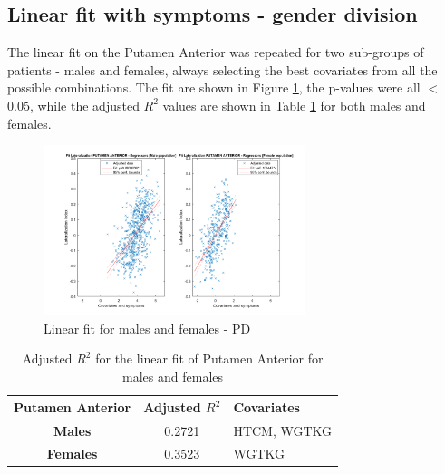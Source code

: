 \documentclass[]{article}
\begin{document}
\begin{multicols}{2}

\subsection{Linear fit with symptoms - gender division}

The linear fit on the Putamen Anterior was repeated for two sub-groups of patients - males and females, always selecting the best covariates from all the possible combinations. The fit are shown in Figure \ref{fig:lin_fit_male_female}, the p-values were all $<$ 0.05, while the adjusted $R^2$ values are shown in Table \ref{tbl:lin_fit_put_ant} for both males and females.

\end{multicols}

\begin{figure}[h]
	\centering
	\includegraphics[width=3in]{../fit_covariates_male_female}
	\caption{Linear fit for males and females - PD}
	\label{fig:lin_fit_male_female}
\end{figure} 

\begin{table}[h]
	\centering
	\begin{tabular}{|c|c|l|}
		\hline
		\textbf{Putamen Anterior} & \textbf{Adjusted $R^2$} & \textbf{Covariates} \\ \hline
		\textbf{Males}            & 0.2721                  & HTCM, WGTKG         \\ \hline
		\textbf{Females}          & 0.3523                  & WGTKG               \\ \hline
	\end{tabular}
	\caption{Adjusted $R^2$ for the linear fit of Putamen Anterior for males and females}
	\label{tbl:lin_fit_put_ant}
\end{table}
\end{document}
